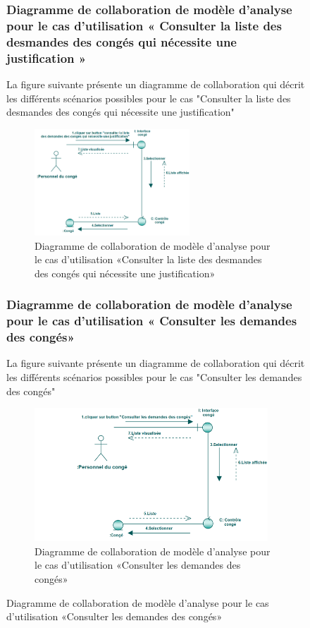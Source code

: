 \documentclass[12 pt]{report}
\begin{document}
\begin{figure}[h]
\begin{center}
\subsubsection{Diagramme  de  collaboration  de  modèle  d'analyse  pour  le  cas  d'utilisation « Consulter la liste des desmandes des congés qui nécessite une justification »  }
La figure suivante présente un diagramme de collaboration qui décrit les différents
scénarios possibles pour le cas "Consulter la liste des desmandes des congés qui nécessite une justification"
\begin{figure}[h]
\begin{center}
\includegraphics[width= 12 cm , height =4cm]{colla_con_jus.PNG}
 \caption{Diagramme  de  collaboration  de  modèle  d'analyse  pour  le  cas  d'utilisation «Consulter la liste des desmandes des congés qui nécessite une justification»}
\end{center}
\end{figure}
\subsubsection{Diagramme  de  collaboration  de  modèle  d'analyse  pour  le  cas  d'utilisation « Consulter les demandes des congés»  }
La figure suivante présente un diagramme de collaboration qui décrit les différents
scénarios possibles pour le cas "Consulter les demandes des congés"
\begin{figure}[h]
\begin{center}
\includegraphics[width= 12 cm , height =5cm]{colla_dem_con.PNG}
 \caption{Diagramme  de  collaboration  de  modèle  d'analyse  pour  le  cas  d'utilisation «Consulter les demandes des congés»}
\end{center}
\end{figure}

\end{center}
\end{figure}
\end{document}
